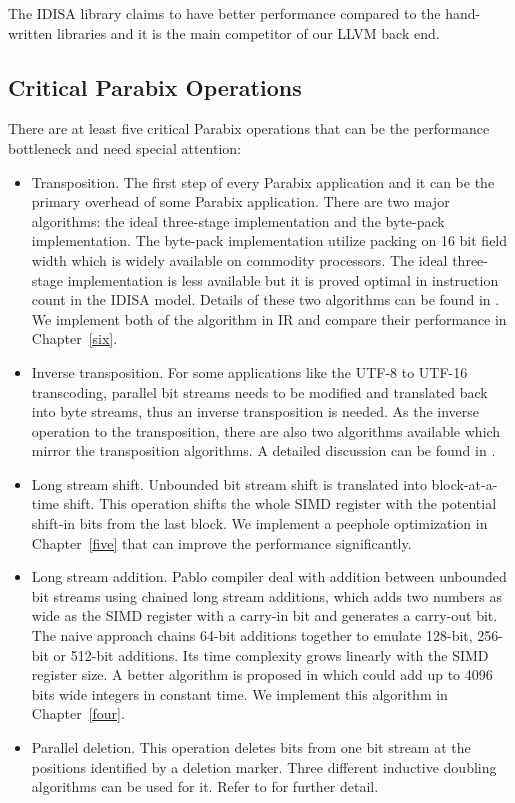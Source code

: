 The IDISA library claims to have better performance compared to the hand-written libraries and it is the main competitor of our LLVM back end.

\subsection{Critical Parabix Operations}
There are at least five critical Parabix operations that can be the performance bottleneck and need special attention:
\begin{itemize}
    \item Transposition. The first step of every Parabix application and it can be the primary overhead of some Parabix application. There are two major algorithms: the ideal three-stage implementation and the byte-pack implementation. The byte-pack implementation utilize packing on 16 bit field width which is widely available on commodity processors. The ideal three-stage implementation is less available but it is proved optimal in instruction count in the IDISA model. Details of these two algorithms can be found in \cite{inductive_doubling_principle}. We implement both of the algorithm in IR and compare their performance in Chapter~\ref{six}.

    \item Inverse transposition. For some applications like the UTF-8 to UTF-16 transcoding, parallel bit streams needs to be modified and translated back into byte streams, thus an inverse transposition is needed. As the inverse operation to the transposition, there are also two algorithms available which mirror the transposition algorithms. A detailed discussion can be found in \cite{rob_u8u16}.

    \item Long stream shift. Unbounded bit stream shift is translated into block-at-a-time shift. This operation shifts the whole SIMD register with the potential shift-in bits from the last block. We implement a peephole optimization in Chapter~\ref{five} that can improve the performance significantly.

    \item Long stream addition. Pablo compiler deal with addition between unbounded bit streams using chained long stream additions, which adds two numbers as wide as the SIMD register with a carry-in bit and generates a carry-out bit. The naive approach chains 64-bit additions together to emulate 128-bit, 256-bit or 512-bit additions. Its time complexity grows linearly with the SIMD register size. A better algorithm is proposed in \cite{rob_regex} which could add up to 4096 bits wide integers in constant time. We implement this algorithm in Chapter~\ref{four}.

    \item Parallel deletion. This operation deletes bits from one bit stream at the positions identified by a deletion marker. Three different inductive doubling algorithms can be used for it. Refer to \cite{rob_u8u16} for further detail.
\end{itemize}

